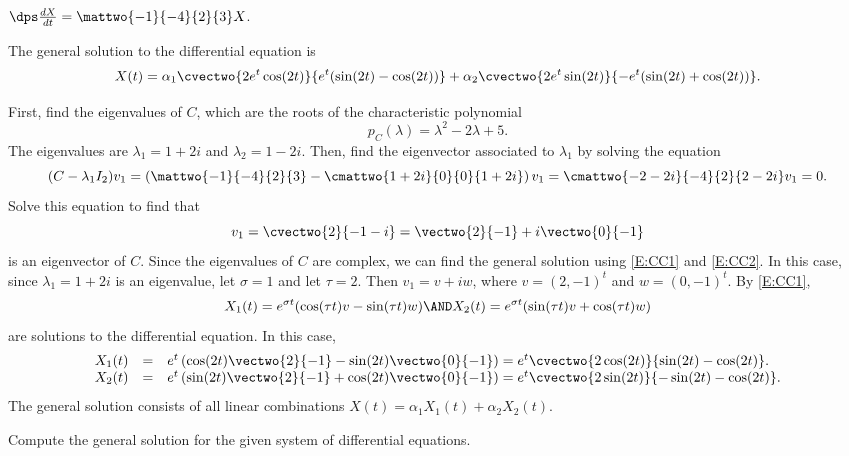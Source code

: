 \documentclass{article}
\begin{document}
\begin{exercise}  \label{c6.6.2a}
$\dps\frac{dX}{dt} = \mattwo{-1}{-4}{2}{3} X$.

\begin{solution}

\ans The general solution to the differential equation is
\[
X(t) =
\alpha_1\cvectwo{2e^t\cos(2t)}{e^t(\sin(2t) - \cos(2t))} +
\alpha_2\cvectwo{2e^t\sin(2t)}{-e^t(\sin(2t) + \cos(2t))}.
\]

\soln First, find the eigenvalues of $C$, which are the roots of the
characteristic polynomial
\[
p_C(\lambda) = \lambda^2 - 2\lambda + 5.
\]
The eigenvalues are $\lambda_1 = 1 + 2i$ and $\lambda_2 = 1 - 2i$.  Then,
find the eigenvector associated to $\lambda_1$ by solving the equation
\[
(C - \lambda_1I_2)v_1 =
\left(\mattwo{-1}{-4}{2}{3} - \cmattwo{1 + 2i}{0}{0}{1 + 2i}\right)v_1
= \cmattwo{-2 - 2i}{-4}{2}{2 - 2i}v_1 = 0.
\]
Solve this equation to find that
\[
v_1 = \cvectwo{2}{-1 - i} = \vectwo{2}{-1} + i\vectwo{0}{-1}
\]
is an eigenvector of $C$.  Since the eigenvalues of $C$ are complex, we
can find the general solution using \eqref{E:CC1} and \eqref{E:CC2}.  In this
case, since $\lambda_1 = 1 + 2i$ is an eigenvalue, let $\sigma = 1$ and
let $\tau = 2$.  Then $v_1 = v + iw$, where $v = (2,-1)^t$ and
$w = (0,-1)^t$.  By \eqref{E:CC1},
\[
X_1(t) = e^{\sigma t}(\cos(\tau t)v - \sin(\tau t)w) \AND
X_2(t) = e^{\sigma t}(\sin(\tau t)v + \cos(\tau t)w)
\]
are solutions to the differential equation.  In this case,
\[
\begin{array}{rcl}
X_1(t) & = & e^t\left(\cos(2t)\vectwo{2}{-1} -
\sin(2t)\vectwo{0}{-1}\right)
= e^t\cvectwo{2\cos(2t)}{\sin(2t) - \cos(2t)}. \\
X_2(t) & = & e^t\left(\sin(2t)\vectwo{2}{-1} +
\cos(2t)\vectwo{0}{-1}\right)
= e^t\cvectwo{2\sin(2t)}{-\sin(2t) - \cos(2t)}.
\end{array}
\]
The general solution consists of all linear combinations
$X(t) = \alpha_1X_1(t) + \alpha_2X_2(t)$.


\end{solution}
\end{exercise}





\problemlabel

Compute the general solution for the given system of differential equations.
\end{document}
